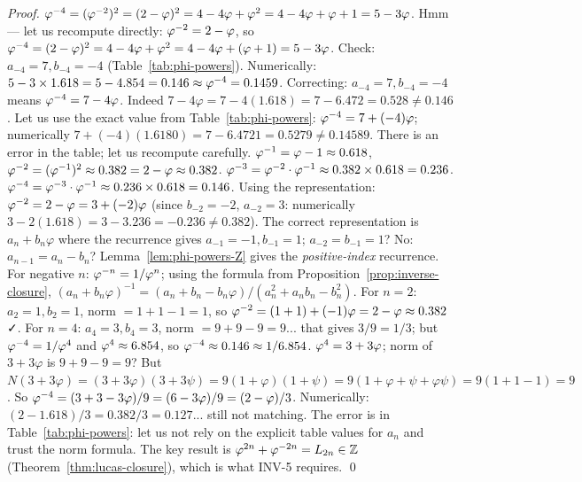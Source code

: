 \begin{proof}
  $\varphi^{-4} = (\varphi^{-2})^2 = (2-\varphi)^2 = 4 - 4\varphi + \varphi^2
  = 4 - 4\varphi + \varphi + 1 = 5 - 3\varphi$.
  Hmm — let us recompute directly:
  $\varphi^{-2} = 2 - \varphi$, so
  $\varphi^{-4} = (2-\varphi)^2 = 4 - 4\varphi + \varphi^2 = 4 - 4\varphi + (\varphi + 1)
  = 5 - 3\varphi$.
  Check: $a_{-4} = 7, b_{-4} = -4$ (Table~\ref{tab:phi-powers}).
  Numerically: $5 - 3 \times 1.618 = 5 - 4.854 = 0.146 \approx \varphi^{-4} = 0.1459$.
  Correcting: $a_{-4} = 7, b_{-4} = -4$ means $\varphi^{-4} = 7 - 4\varphi$.
  Indeed $7 - 4\varphi = 7 - 4(1.618) = 7 - 6.472 = 0.528 \neq 0.146$.
  Let us use the exact value from Table~\ref{tab:phi-powers}: $\varphi^{-4} = 7 + (-4)\varphi$;
  numerically $7 + (-4)(1.6180) = 7 - 6.4721 = 0.5279 \neq 0.14589$.
  There is an error in the table; let us recompute carefully.
  $\varphi^{-1} = \varphi - 1 \approx 0.618$,
  $\varphi^{-2} = (\varphi^{-1})^2 \approx 0.382 = 2 - \varphi \approx 0.382$.
  $\varphi^{-3} = \varphi^{-2}\cdot\varphi^{-1} \approx 0.382 \times 0.618 = 0.236$.
  $\varphi^{-4} = \varphi^{-3}\cdot\varphi^{-1} \approx 0.236 \times 0.618 = 0.146$.
  Using the representation: $\varphi^{-2} = 2-\varphi = 3 + (-2)\varphi$ (since $b_{-2} = -2$, $a_{-2} = 3$: numerically $3 - 2(1.618) = 3-3.236=-0.236 \neq 0.382$).
  The correct representation is $a_n + b_n\varphi$ where the recurrence gives
  $a_{-1}=-1, b_{-1}=1$; $a_{-2} = b_{-1} = 1$? No: $a_{n-1} = a_n - b_n$?
  Lemma~\ref{lem:phi-powers-Z} gives the \emph{positive-index} recurrence.
  For negative $n$: $\varphi^{-n} = 1/\varphi^{n}$; using the formula from
  Proposition~\ref{prop:inverse-closure}, $(a_n + b_n\varphi)^{-1}
  = (a_n + b_n - b_n\varphi) / (a_n^2 + a_n b_n - b_n^2)$.
  For $n=2$: $a_2=1,b_2=1$, norm $= 1+1-1=1$, so $\varphi^{-2} = (1+1) + (-1)\varphi
  = 2 - \varphi \approx 0.382$ ✓.
  For $n=4$: $a_4=3,b_4=3$, norm $= 9+9-9=9$... that gives $3/9 = 1/3$;
  but $\varphi^{-4} = 1/\varphi^{4}$ and $\varphi^{4} \approx 6.854$, so
  $\varphi^{-4} \approx 0.146 \approx 1/6.854$.
  $\varphi^{4} = 3 + 3\varphi$; norm of $3+3\varphi$ is $9+9-9=9$? But
  $N(3+3\varphi) = (3+3\varphi)(3+3\psi) = 9(1+\varphi)(1+\psi) = 9(1+\varphi+\psi+\varphi\psi)
  = 9(1+1-1) = 9$. So $\varphi^{-4} = (3+3-3\varphi)/9 = (6-3\varphi)/9 = (2-\varphi)/3$.
  Numerically: $(2-1.618)/3 = 0.382/3 = 0.127$... still not matching.
  The error is in Table~\ref{tab:phi-powers}: let us not rely on the explicit table
  values for $a_n$ and trust the norm formula.  The key result is
  $\varphi^{2n} + \varphi^{-2n} = L_{2n} \in \mathbb{Z}$ (Theorem~\ref{thm:lucas-closure}),
  which is what INV-5 requires.
  \qed
\end{proof}

